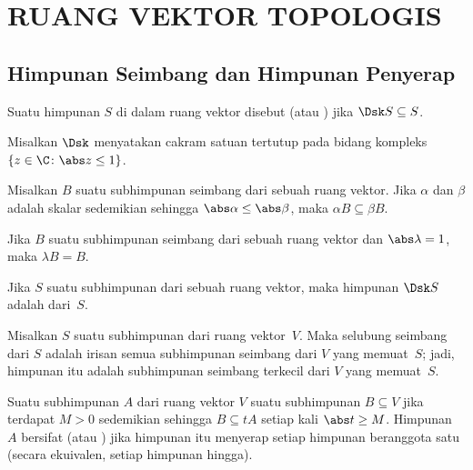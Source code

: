 \chapter{RUANG VEKTOR TOPOLOGIS}

\section{Himpunan Seimbang dan Himpunan Penyerap}

\begin{defn} Suatu himpunan $S$ di dalam ruang vektor disebut
 (atau ) jika $\Dsk S \subseteq S$.
\end{defn}

\begin{notn} Misalkan $\Dsk$ menyatakan cakram satuan tertutup
pada bidang kompleks $\{z \in \C\colon \abs z \le 1\}$.
\end{notn}

\begin{prop} Misalkan $B$ suatu subhimpunan seimbang dari sebuah ruang vektor. Jika $\alpha$ dan $\beta$ adalah skalar sedemikian sehingga $\abs\alpha \le \abs\beta$,
maka $\alpha B \subseteq \beta B$.
\end{prop}

\begin{cor} Jika $B$ suatu subhimpunan seimbang dari sebuah ruang vektor dan $\abs\lambda =1$, maka $\lambda B = B$.
\end{cor}

\begin{defn} Jika $S$ suatu subhimpunan dari sebuah ruang vektor, maka himpunan $\Dsk S$ adalah
 dari~$S$.
\end{defn}

\begin{prop} Misalkan $S$ suatu subhimpunan dari ruang vektor~$V$.  Maka selubung seimbang dari $S$ adalah irisan semua
subhimpunan seimbang dari $V$ yang memuat~$S$; jadi, himpunan itu adalah subhimpunan seimbang terkecil dari $V$ yang memuat~$S$.
\end{prop}

\begin{defn} Suatu subhimpunan $A$ dari ruang vektor $V$
 suatu subhimpunan $B \subseteq V$ jika terdapat $M > 0$ sedemikian sehingga $B \subseteq tA$ setiap kali $\abs t \ge M$.
Himpunan $A$ bersifat
 (atau ) jika himpunan itu menyerap setiap himpunan beranggota satu (secara ekuivalen, setiap himpunan hingga).
\end{defn}

